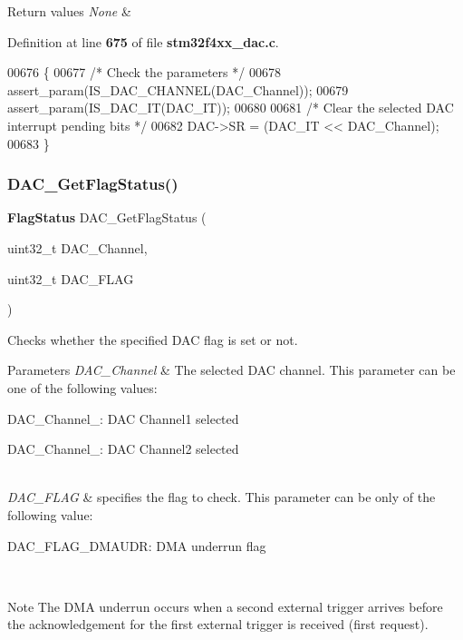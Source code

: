 \begin{DoxyRetVals}{Return values}
{\em None} & \\
\hline
\end{DoxyRetVals}


Definition at line \textbf{ 675} of file \textbf{ stm32f4xx\+\_\+dac.\+c}.


\begin{DoxyCode}
00676 \{
00677   \textcolor{comment}{/* Check the parameters */}
00678   assert_param(IS_DAC_CHANNEL(DAC\_Channel));
00679   assert_param(IS_DAC_IT(DAC\_IT)); 
00680 
00681   \textcolor{comment}{/* Clear the selected DAC interrupt pending bits */}
00682   DAC->SR = (DAC\_IT << DAC\_Channel);
00683 \}
\end{DoxyCode}
\mbox{\label{group__DAC__Group3_ga9ee60b78f0ccd23bfbe54bce2a2f909b}} 
\subsubsection{D\+A\+C\+\_\+\+Get\+Flag\+Status()}
{\footnotesize\ttfamily \textbf{ Flag\+Status} D\+A\+C\+\_\+\+Get\+Flag\+Status (\begin{DoxyParamCaption}\item[{uint32\+\_\+t}]{D\+A\+C\+\_\+\+Channel,  }\item[{uint32\+\_\+t}]{D\+A\+C\+\_\+\+F\+L\+AG }\end{DoxyParamCaption})}



Checks whether the specified D\+AC flag is set or not. 


\begin{DoxyParams}{Parameters}
{\em D\+A\+C\+\_\+\+Channel} & The selected D\+AC channel. This parameter can be one of the following values\+: \begin{DoxyItemize}
\item D\+A\+C\+\_\+\+Channel\+\_\+: D\+AC Channel1 selected \item D\+A\+C\+\_\+\+Channel\+\_\+: D\+AC Channel2 selected \end{DoxyItemize}
\\
\hline
{\em D\+A\+C\+\_\+\+F\+L\+AG} & specifies the flag to check. This parameter can be only of the following value\+: \begin{DoxyItemize}
\item D\+A\+C\+\_\+\+F\+L\+A\+G\+\_\+\+D\+M\+A\+U\+DR\+: D\+MA underrun flag \end{DoxyItemize}
\\
\hline
\end{DoxyParams}
\begin{DoxyNote}{Note}
The D\+MA underrun occurs when a second external trigger arrives before the acknowledgement for the first external trigger is received (first request). 
\end{DoxyNote}

